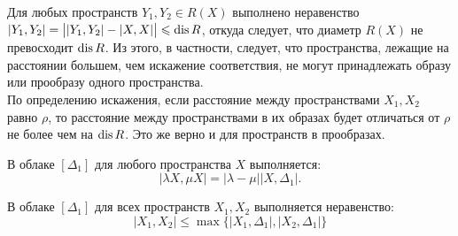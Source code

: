  Для любых пространств $Y_1, Y_2 \in R(X)$ выполнено неравенство
$|Y_1, Y_2| = \big| |Y_1,Y_2| - |X,X|\big| \leqslant \operatorname{dis} R$, откуда следует, что
диаметр  $R(X)$ не превосходит $\operatorname{dis} R$. Из этого, в частности, следует, что
пространства, лежащие на расстоянии большем, чем искажение соответствия, не
могут принадлежать образу или прообразу одного пространства.\\ По определению
искажения, если расстояние между пространствами $X_1, X_2$ равно $\rho$, то
расстояние между пространствами в их образах будет отличаться от $\rho$ не более
чем на $\operatorname{dis} R$. Это же верно и для пространств в прообразах.
 \begin{remark} В облаке $[\Delta_1]$ для любого пространства $X$ выполняется:
	$$|\lambda X, \mu X| = |\lambda - \mu||X,\Delta_1|.$$
 \end{remark}
 \begin{remark} В облаке $[\Delta_{1}]$ для всех пространств $X_{1}, X_{2}$
выполняется неравенство:
   $$|X_{1},X_{2}| \le \max\{|X_{1}, \Delta_{1}|,|X_{2},\Delta_{1}|\}$$
 \end{remark}
